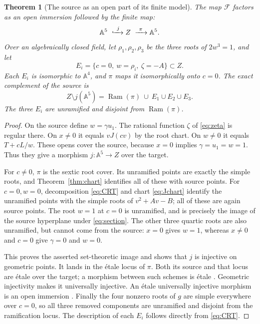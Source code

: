 \documentclass[11pt,a4paper]{article}
\newtheorem{theorem}{Theorem}[section]
\theoremstyle{definition}
\newcommand{\A}{\mathbb A}
\newcommand{\Ram}{\operatorname{Ram}}
\newcommand{\F}{\mathcal F}
\begin{document}
\begin{theorem}[The source as an open part of its finite model]
\label{thm:boundary}
The map $\F$ factors as an open immersion followed by the finite map:
\[
 \A^5\ \xhookrightarrow{\ j\ } Z\ \xrightarrow{\ \pi\ }\A^5.
\]
Over an algebraically closed field, let $\rho_1,\rho_2,\rho_3$ be the
three roots of $2w^3=1$, and let
\[
 E_i=\{c=0,\ w=\rho_i,\ \zeta=-A\}\subset Z.
\]
Each $E_i$ is isomorphic to $\A^4$, and $\pi$ maps it isomorphically onto
$c=0$. The exact complement of the source is
\begin{equation}\label{eq:boundary}
 Z\setminus j(\A^5)=\Ram(\pi)\ \cup\ E_1\cup E_2\cup E_3.
\end{equation}
The three $E_i$ are unramified and disjoint from $\Ram(\pi)$.
\end{theorem}
\begin{proof}
On the source define $w=\gamma u_1$. The rational function $\zeta$ of
\eqref{eq:zeta} is regular there. On $x\ne0$ it equals $vJ(cv)$ by the
root chart. On $w\ne0$ it equals $T+cL/w$. These opens cover the source,
because $x=0$ implies $\gamma=u_1=w=1$. Thus they give a morphism
$j:\A^5\to Z$ over the target.

For $c\ne0$, $\pi$ is the sextic root cover. Its unramified points are
exactly the simple roots, and Theorem~\ref{thm:chart} identifies all of
these with source points. For $c=0,w=0$, decomposition
\eqref{eq:CRT} and chart \eqref{eq:Jchart} identify the unramified points
with the simple roots of $v^2+Av-B$; all of these are again source points.
The root $w=1$ at $c=0$ is unramified, and is precisely the image of the
source hyperplane under \eqref{eq:section}. The other three quartic roots
are also unramified, but cannot come from the source: $x=0$ gives $w=1$,
whereas $x\ne0$ and $c=0$ give $\gamma=0$ and $w=0$.

This proves the asserted set-theoretic image and shows that $j$ is
injective on geometric points. It lands in the \'etale locus of $\pi$.
Both its source and that locus are \'etale over the target; a morphism
between such schemes is \'etale \cite[Tag 02GH]{StacksEtale}. Geometric
injectivity makes it universally injective. An \'etale universally
injective morphism is an open immersion \cite[Tag 025G]{StacksOpen}.
Finally the four nonzero roots of $g$ are simple everywhere over $c=0$,
so all three removed components are unramified and disjoint from the
ramification locus. The description of each $E_i$ follows directly from
\eqref{eq:CRT}.
\end{proof}
\end{document}
